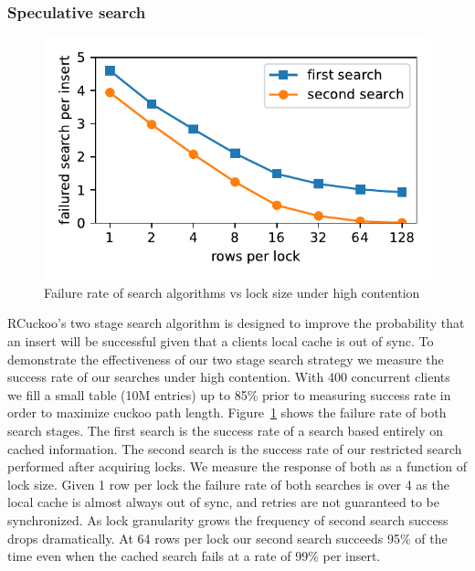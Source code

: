 \subsubsection{Speculative search}

\label{sec:search_success}
\begin{figure}[t]
    \includegraphics[width=0.99\linewidth]{fig/search_success_lock_size.pdf}
    \caption{Failure rate of search algorithms vs lock size under high contention}
    \label{fig:search_success}
\end{figure}

RCuckoo's two stage search algorithm is designed to improve
the probability that an insert will be successful given that
a clients local cache is out of sync. To demonstrate the
effectiveness of our two stage search strategy we measure
the success rate of our searches under high contention. With
400 concurrent clients we fill a small table (10M entries)
up to 85\% prior to measuring success rate in order to
maximize cuckoo path length. Figure~\ref{fig:search_success}
shows the failure rate of both search stages. The first
search is the success rate of a search based entirely on
cached information. The second search is the success rate of
our restricted search performed after acquiring locks. We
measure the response of both as a function of lock size.
Given 1 row per lock the failure rate of both searches is
over 4 as the local cache is almost always out of sync, and
retries are not guaranteed to be synchronized. As lock
granularity grows the frequency of second search success
drops dramatically. At 64 rows per lock our second search
succeeds 95\% of the time even when the cached search fails
at a rate of 99\% per insert.


